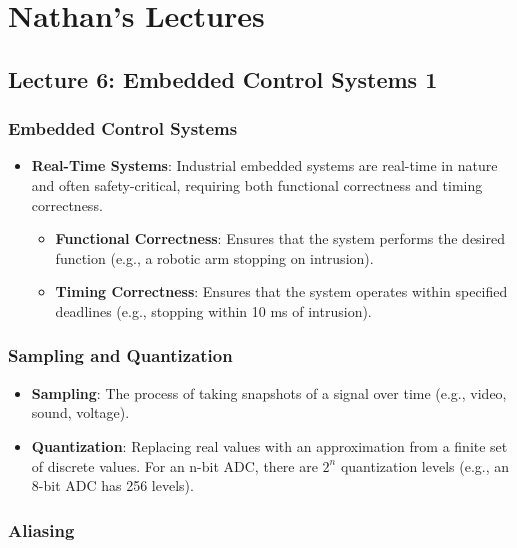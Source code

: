 \documentclass[
  14pt,
  a4paper,
  DIV=11,
  numbers=noendperiod,
  headinclude=true,
  footinclude=true]{scrreprt}
\providecommand{\tightlist}{%
  \setlength{\itemsep}{0pt}\setlength{\parskip}{0pt}}\usepackage{longtable,booktabs,array}
\begin{document}
\part{Nathan's Lectures}

\chapter{Lecture 6: Embedded Control Systems
1}\label{lecture-6-embedded-control-systems-1}

\section{Embedded Control Systems}\label{embedded-control-systems}

\begin{itemize}
\tightlist
\item
  \textbf{Real-Time Systems}: Industrial embedded systems are real-time
  in nature and often safety-critical, requiring both functional
  correctness and timing correctness.

  \begin{itemize}
  \tightlist
  \item
    \textbf{Functional Correctness}: Ensures that the system performs
    the desired function (e.g., a robotic arm stopping on intrusion).
  \item
    \textbf{Timing Correctness}: Ensures that the system operates within
    specified deadlines (e.g., stopping within 10 ms of intrusion).
  \end{itemize}
\end{itemize}

\section{Sampling and Quantization}\label{sampling-and-quantization}

\begin{itemize}
\tightlist
\item
  \textbf{Sampling}: The process of taking snapshots of a signal over
  time (e.g., video, sound, voltage).
\item
  \textbf{Quantization}: Replacing real values with an approximation
  from a finite set of discrete values. For an n-bit ADC, there are
  \(2^n\) quantization levels (e.g., an 8-bit ADC has 256 levels).
\end{itemize}

\section{Aliasing}\label{aliasing}
\end{document}
